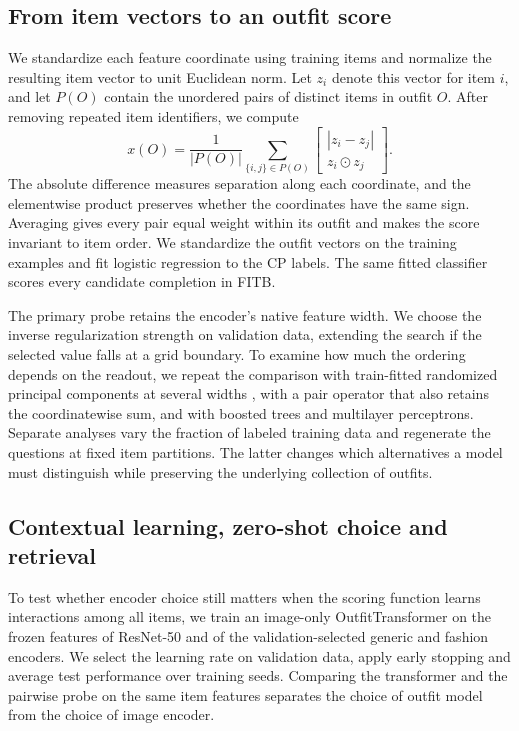 \documentclass[preprint,12pt]{elsarticle}
\begin{document}
\subsection{From item vectors to an outfit score}
We standardize each feature coordinate using training items and normalize the
resulting item vector to unit Euclidean norm. Let $z_i$ denote this vector for
item $i$, and let $P(O)$ contain the unordered pairs of distinct items in outfit
$O$. After removing repeated item identifiers, we compute
\begin{equation}
 x(O)=\frac{1}{|P(O)|}\sum_{\{i,j\}\in P(O)}
 \begin{bmatrix} |z_i-z_j| \\ z_i\odot z_j \end{bmatrix}.
\end{equation}
The absolute difference measures separation along each coordinate, and the
elementwise product preserves whether the coordinates have the same sign.
Averaging gives every pair equal weight within its outfit and makes the score
invariant to item order. We standardize the outfit vectors on the training
examples and fit logistic regression to the CP labels. The same fitted classifier
scores every candidate completion in FITB.

The primary probe retains the encoder's native feature width. We choose the inverse
regularization strength on validation data, extending the search if the selected
value falls at a grid boundary. To examine how much the ordering depends on the
readout, we repeat the comparison with train-fitted randomized principal components
at several widths \cite{halko2011}, with a pair operator that also retains the coordinatewise sum,
and with boosted trees and multilayer perceptrons. Separate analyses vary the
fraction of labeled training data and regenerate the questions at fixed item
partitions. The latter changes which alternatives a model must distinguish while
preserving the underlying collection of outfits.


\subsection{Contextual learning, zero-shot choice and retrieval}
To test whether encoder choice still matters when the scoring function learns
interactions among all items, we train an image-only OutfitTransformer
\cite{sarkar2023outfittransformer} on the frozen features of ResNet-50 and of the
validation-selected generic and fashion encoders. We select the learning rate on
validation data, apply early stopping and average test performance over training
seeds. Comparing the transformer and the pairwise probe on the same item features
separates the choice of outfit model from the choice of image encoder.
\end{document}
